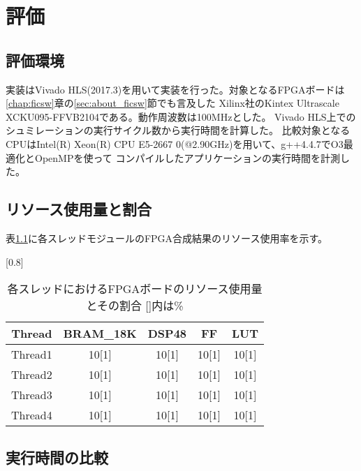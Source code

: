 \chapter{評価}
{
\label{chap:eval}

\section{評価環境}
\label{sec:eval_env}
実装はVivado HLS(2017.3)を用いて実装を行った。対象となるFPGAボードは\ref{chap:ficsw}章の\ref{sec:about_ficsw}節でも言及した
Xilinx社のKintex Ultrascale　XCKU095-FFVB2104である。動作周波数は100MHzとした。
Vivado HLS上でのシュミレーションの実行サイクル数から実行時間を計算した。
比較対象となるCPUはIntel(R) Xeon(R) CPU E5-2667 0(@2.90GHz)を用いて、g++4.4.7でO3最適化とOpenMPを使って
コンパイルしたアプリケーションの実行時間を計測した。

\section{リソース使用量と割合}
\label{sec:resource_util}
表\ref{table:resource_util}に各スレッドモジュールのFPGA合成結果のリソース使用率を示す。

\begin{table}[p]
    \begin{center}
    \caption{各スレッドにおけるFPGAボードのリソース使用量とその割合 []内は\%}
    \label{table:resource_util}
    \scalebox{0.8}[0.8]{
    \begin{tabular}{|c|c|c|c|c|} \hline
    \multicolumn{1}{|c|}{Thread} & \multicolumn{1}{|c|}{BRAM_18K} & \multicolumn{1}{|c|}{DSP48} & \multicolumn{1}{|c|}{FF} & \multicolumn{1}{|c|}{LUT} \\ \hline \hline
    Thread1       & 10[1] & 10[1] & 10[1] & 10[1] \\ \hline
    Thread2       & 10[1] & 10[1] & 10[1] & 10[1] \\ \hline
    Thread3       & 10[1] & 10[1] & 10[1] & 10[1] \\ \hline
    Thread4       & 10[1] & 10[1] & 10[1] & 10[1] \\ \hline
    \end{tabular}
    }
    \end{center}
\end{table}


\section{実行時間の比較}
\label{sec:resource_util}

}
